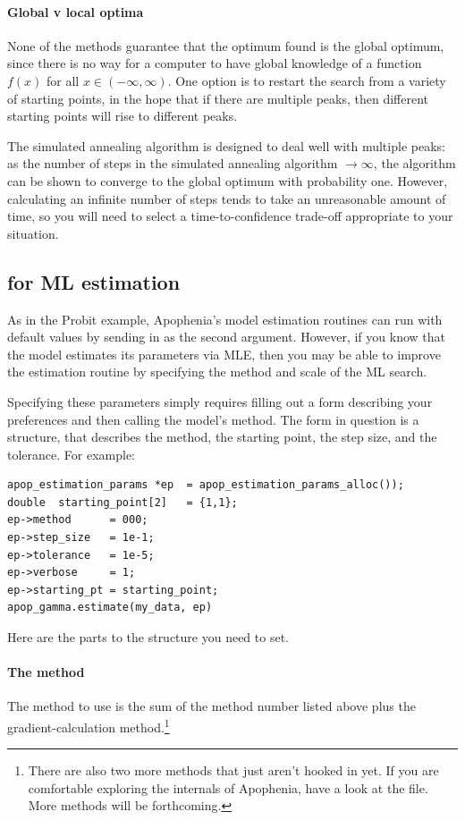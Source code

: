 \paragraph{Global v local optima}
None of the methods guarantee that the optimum found is the global
optimum, since there is no way for a computer to have global knowledge
of a function $f(x)$ for all $x \in (-\infty, \infty)$. One option is
to restart the search from a variety of starting points, in the hope
that if there are multiple peaks, then different starting points will
rise to different peaks.

The simulated annealing algorithm is designed to deal well with multiple
peaks: as the number of steps in the simulated annealing algorithm $\to
\infty$, the algorithm can be shown to converge to the global optimum
with probability one. However, calculating an infinite number of steps
tends to take an unreasonable amount of time, so you will need to select
a time-to-confidence trade-off appropriate to your situation.


\subsection{ for ML estimation}
As in the Probit example, Apophenia's model estimation routines can run
with default values by sending in  as the second
argument. However, if you know that the model estimates its parameters
via MLE, then you may be able to improve the estimation routine by
specifying the method and scale of the ML search.

Specifying these parameters simply requires 
filling out a form describing your preferences and then calling the model's  method.
The form in question is a  structure, that
describes the method, the starting point, the step size, and the
tolerance.
For example:
\begin{lstlisting}
apop_estimation_params *ep  = apop_estimation_params_alloc());
double  starting_point[2]   = {1,1};
ep->method      = 000;
ep->step_size   = 1e-1;
ep->tolerance   = 1e-5;
ep->verbose     = 1;
ep->starting_pt = starting_point;
apop_gamma.estimate(my_data, ep)
\end{lstlisting}

Here are the parts to the  
structure you need to set. 

\paragraph{The method} The method to use is the sum of the method number
listed above plus the gradient-calculation method.\footnote{There are also two more methods that just aren't hooked in yet. If you
are comfortable exploring the internals of Apophenia, have a look at
the  file. More methods will be forthcoming.}

